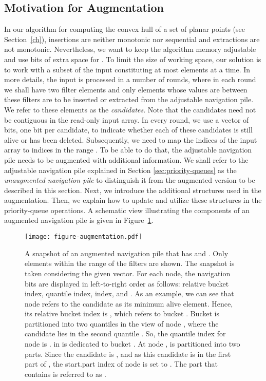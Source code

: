 \documentclass[final,onetabnum,onefignum,onethmnum]{siamltex}
\begin{document}
\subsection{Motivation for Augmentation} 
In our algorithm for computing the convex hull of a set of planar points (see Section~\ref{ch}), 
insertions are neither monotonic nor sequential and extractions are not monotonic. 
Nevertheless, we want to keep the algorithm memory adjustable and use  bits of extra
space for .  To limit the size of working space, our
solution is to work with a subset of the input constituting at most
 elements at a time. In more details, the input is processed in a
number of rounds, where in each round we shall have two filter
elements and only elements whose values are between these filters are
to be inserted or extracted from the adjustable navigation pile. We
refer to these  elements as the \emph{candidates}.  Note that
the candidates need not be contiguous in the read-only input array.  
In every round, we use a vector of  bits, one bit per candidate, 
to indicate whether each of these candidates is still alive or has been deleted.
Subsequently, we need to map the indices of the input array to
indices in the range . To be able to do that,
the adjustable navigation pile needs to be augmented with additional
information. We shall refer to the adjustable navigation pile explained in
Section \ref{sec:priority-queues} as the \emph{unaugmented navigation
  pile} to distinguish it from the augmented version to be described
in this section.  Next, we introduce the additional structures used in
the augmentation. Then, we explain how to update and utilize these
structures in the priority-queue operations.  A schematic view
illustrating the components of an augmented navigation pile is given in
Figure~\ref{ANP}.

\begin{figure}[t!]
\centerline{\texttt{[image: figure-augmentation.pdf]}}
\caption{A snapshot of an augmented navigation pile that has 
  and . Only elements within the range of the filters are
  shown. The snapshot is taken considering the given 
  vector. For each node, the navigation bits are displayed in
  left-to-right order as follows: relative bucket index, quantile
  index,  index, and . As
  an example, we can see that node  refers to the candidate  as
  its minimum alive element. Hence, its relative bucket index is ,
  which refers to bucket . Bucket  is partitioned into two
  quantiles in the view of node , where the candidate  lies in
  the second quantile . So, the quantile index for node  is
  .  in  is dedicated to
  bucket . At node ,  is partitioned
  into two parts.  Since the candidate  is 
  , and as this candidate is in the
  first part of , the start.part index of node
   is set to .  The part that contains 
  is referred to as .}	
\label{ANP}
\vspace{-0.5cm}
\end{figure}
\end{document}
